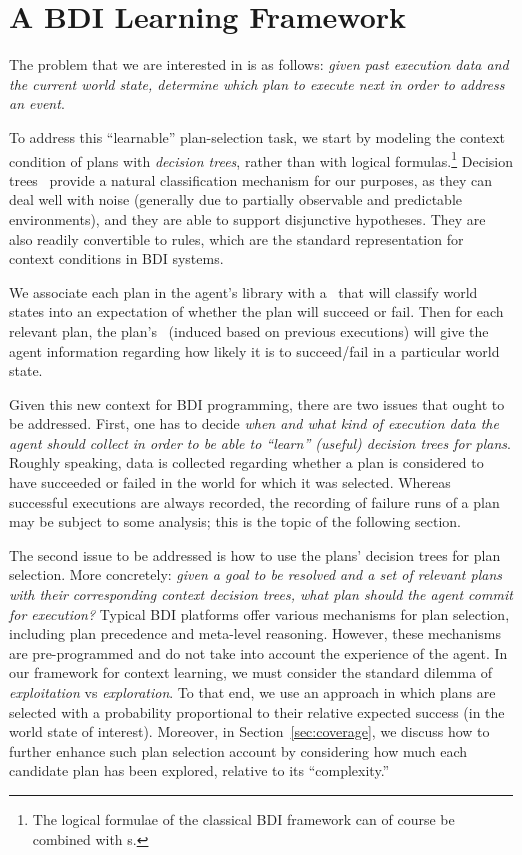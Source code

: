 \section{A BDI Learning Framework}\label{sec:framework}


The problem that we are interested in is as follows: \emph{given past execution
data and the current world state, determine which plan to execute next 
in order to address an event}.


To address this ``learnable'' plan-selection task, we start by modeling the
context condition of plans with \emph{decision trees}, rather than with logical
formulas.\footnote{The logical formulae of the classical BDI framework can of course be combined with \dt s.}
Decision trees~\cite{Mitchell97:ML}  provide a natural classification mechanism
for our purposes, as they can deal well with noise (generally due to partially
observable and predictable environments), and they are able to support
disjunctive hypotheses. They are also readily convertible to rules, which are the
standard representation for context conditions in BDI systems.


We associate each plan in the agent's library with a \dt\ that will classify world
states into an expectation of whether the plan will succeed or fail. Then for
each relevant plan, the plan's \dt\ (induced based on previous executions) will
give the agent information regarding how likely it is to succeed/fail in a
particular world state.


Given this new context for BDI programming, there are two issues that ought to be
addressed.
First, one has to decide \emph{when and what kind of execution data the agent should
collect in order to be able to ``learn'' (useful) decision trees for plans}.
Roughly speaking, data is collected regarding whether a plan is considered to
have succeeded or failed in the world for which it was selected.
  Whereas successful executions are always recorded, the recording of failure
runs of a plan may be subject to some analysis; this is the topic of the following section.



The second issue to be addressed is how to use the plans' decision trees for plan
selection. More concretely: \emph{given a goal to be resolved and a set of
relevant plans with their corresponding context decision trees, what plan should
the agent commit for execution?}
Typical BDI platforms offer various mechanisms for plan selection, including plan
precedence and meta-level reasoning. However, these mechanisms are pre-programmed
and do not take into account the experience of the agent.
In our framework for context learning, we must consider the standard dilemma of
\emph{exploitation} vs \emph{exploration}. To that end, we use an 
approach in which plans are selected with a probability proportional to their relative expected
success (in the world state of interest). Moreover, in
Section~\ref{sec:coverage}, we discuss how to further enhance such plan selection
account by considering how much each candidate plan has been
explored, relative to its ``complexity.''



